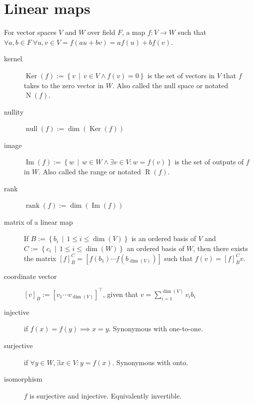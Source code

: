 \documentclass[tbtags,columns=2]{cheatsheet}
\begin{document}
\section{Linear maps}
For vector spaces $V$ and $W$ over field $F$, a map $f:V\to W$ such that $\forall a,b\in F\:\forall u,v \in V = f(au + bv) = af(u) + bf(v)$.
\begin{description}
    \item[kernel] $\operatorname{Ker}(f) := \left\{ v \,\middle|\, v\in V \land f(v) = 0 \right\}$ is the set of vectors in $V$ that $f$ takes to the zero vector in $W$. Also called the null space or notated $\operatorname{N}(f)$.
    \item[nullity] $\operatorname{null}(f) := \dim(\operatorname{Ker}(f))$
    \item[image]  $\operatorname{Im}(f) := \left\{ w \,\middle|\, w \in W \land \exists v\in V : w = f(v) \right\}$ is the set of outputs of $f$ in $W$. Also called the range or notated $\operatorname{R}(f)$.
    \item[rank] $\operatorname{rank}(f):=\dim(\operatorname{Im}(f))$
    \item[matrix of a linear map] If $B:=\left\{ b_i \,\middle|\, 1\leq i \leq \dim(V) \right\}$ is an ordered basis of $V$ and $C:=\left\{ c_i \,\middle|\, 1\leq i \leq \dim(W) \right\}$ an ordered basis of $W$, then there exists the matrix $[f]_B^C = \left[ f\left(b_1\right) \cdots f\left(b_{\dim(V)}\right)  \right]$ such that $f(v)=[f]_B^C v$.
    \item[coordinate vector] $\left[ v \right]_B := \left[ v_1 \cdots v_{\dim(V)} \right]^\intercal$, given that $v=\sum_{i=1}^{\dim(V)}v_i b_i$
    \item[injective] if $f(x) = f(y) \implies x = y$. Synonymous with one-to-one.
    \item[surjective] if $\forall y \in W, \exists x \in V : y = f(x)$. Synonymous with onto.
    \item[isomorphism] $f$ is surjective and injective. Equivalently invertible.
\end{description}
\end{document}
